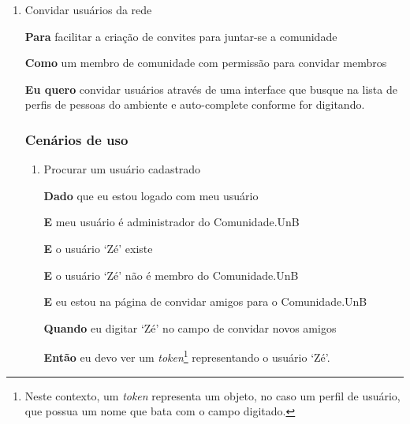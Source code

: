 \begin{enumerate}

\item Convidar usuários da rede

	\textbf{Para} facilitar a criação de convites para juntar-se a comunidade

	\textbf{Como} um membro de comunidade com permissão para convidar membros

	\textbf{Eu quero} convidar usuários através de uma interface que busque na lista
	de perfis de pessoas do ambiente e auto-complete conforme for digitando.

\subsubsection*{Cenários de uso}

	\begin{enumerate}

		\item Procurar um usuário cadastrado

		\textbf{Dado} que eu estou logado com meu usuário

		\textbf{E} meu usuário é administrador do Comunidade.UnB

		\textbf{E} o usuário `Zé' existe

		\textbf{E} o usuário `Zé' não é membro do Comunidade.UnB

		\textbf{E} eu estou na página de convidar amigos para o Comunidade.UnB

		\textbf{Quando} eu digitar `Zé' no campo de convidar novos amigos

		\textbf{Então} eu devo ver um \textit{token}\footnote{Neste contexto, um
		\textit{token} representa um objeto, no caso um perfil de usuário, que possua
		um nome que bata com o campo digitado.} representando o usuário `Zé'.

	\end{enumerate}


\end{enumerate}	


